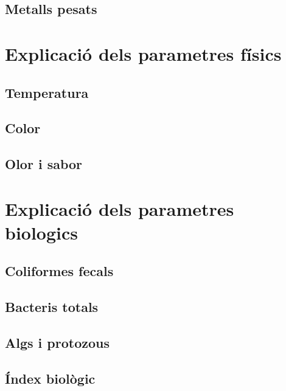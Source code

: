 \subsection{Metalls pesats} \label{subsec:metallspesats}


\section{Explicació dels parametres físics}

\subsection{Temperatura} \label{subsec:temperatura}

\subsection{Color} \label{subsec:color}

\subsection{Olor i sabor} \label{subsec:olorisabor}

\section{Explicació dels parametres biologics}

\subsection{Coliformes fecals} \label{subsec:coliformes}

\subsection{Bacteris totals} \label{subsec:bacteris}

\subsection{Algs i protozous} \label{subsec:algsiprotozous}

\subsection{Índex biològic} \label{subsec:indexbiologic}


